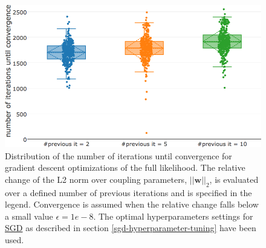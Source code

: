 \documentclass[11pt,a4paper,twoside]{book}
\newcommand{\eq}{\!=\!}
\newcommand{\w}{\mathbf{w}}
\theoremstyle{definition}
\theoremstyle{definition}
\theoremstyle{remark}
\begin{document}
\begin{figure}

{\centering \includegraphics[width=0.85\linewidth]{img/full_likelihood/appendix/distribution_numiterations_against_convergence_prev} 

}

\caption{Distribution of the
number of iterations until convergence for gradient descent
optimizations of the full likelihood. The relative change of the L2 norm
over coupling parameters, \(||\w||_2\), is evaluated over a defined
number of previous iterations and is specified in the legend.
Convergence is assumed when the relative change falls below a small
value \(\epsilon \eq 1e-8\). The optimal hyperparameters settings for
\protect\hyperlink{abbrev}{SGD} as described in section
\ref{sgd-hyperparameter-tuning} have been used.}\label{fig:numit-convergence-convergence-prev}
\end{figure}
\end{document}
